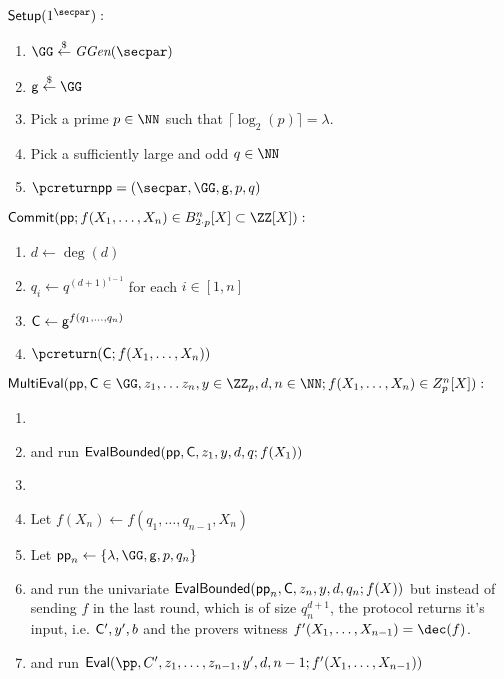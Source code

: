 \documentclass{article}
\theoremstyle{definition}
\begin{document}
 \begin{mdframed}[userdefinedwidth=\textwidth]
\begin{minipage}{\textwidth}
	\begin{flushleft}
	$\pro{Setup}(1^\secpar):$
		\begin{enumerate}[nolistsep]
			\item $ \GG \sample \ggen(\secpar)$
			\item $ \gr{g} \sample \GG$
			\item Pick a prime $p\in \NN$ such that $\lceil\log_2(p)\rceil=\lambda$.
			\item Pick a sufficiently large and odd $q\in \NN$
			\item $\pcreturn \params = (\secpar,\GG,\gr{g},p,q)$
		\end{enumerate}
	$\pro{Commit}(\crs;f(X_1,\dots,X_n) \in B_{2\cdot p}^n[X]\subset \ZZ[X]):$ 		\begin{enumerate}[nolistsep]
			\item $d\gets \deg(d)$
			\item $q_i\gets q^{(d+1)^{i-1}}$ for each $i\in [1,n]$
			\item $\mathsf{C} \gets \mathsf{g}^{f(q_1,\dots,q_n)}$
			\item $\pcreturn (\gr{C};f(X_1,\dots,X_n))$
		\end{enumerate}
			\end{flushleft}
\end{minipage}
\end{mdframed}
 
 \begin{mdframed}
\begin{minipage}{\textwidth}
			$\pro{MultiEval}(\crs, \gr{C}\in \GG, z_1,\dots z_n,y \in \ZZ_p, d,n \in \NN; f(X_1,\dots,X_n)\in Z_p^n[X]) :$ 			\begin{enumerate}[nolistsep]
			\item {} 
			\item \pcind[1] \prover and \verifier run $\textsf{{EvalBounded}}(\textsf{pp},\mathsf{C},z_1,y,d,q;f(X_1))$ 
			\item \pcelse
			\item \pcind[1] Let $f(X_n)\gets f(q_1,\dots,q_{n-1},X_n)$
			\item \pcind[1] Let $\crs_n \gets \{\lambda,\GG,\gr{g},p,q_n\}$
			\item \pcind[1] \prover and \verifier run the univariate $\textsf{{EvalBounded}}(\textsf{pp}_n,\mathsf{C},z_n,y,d,q_n;f(X))$ but instead of sending $f$ in the last round, which is of size $q_n^{d+1}$, the protocol returns it's input, i.e. $\mathsf{C}',y',b$ and the provers witness $f'(X_1,\dots,X_{n-1})=\dec(f)$.
			\item \pcind[1]\prover and \verifier run $\eval(\pp,C',z_1,\dots,z_{n-1},y',d,n-1;f'(X_1,\dots,X_{n-1}))$
		    \end{enumerate}
      \end{minipage}
\end{mdframed}
\end{document}
